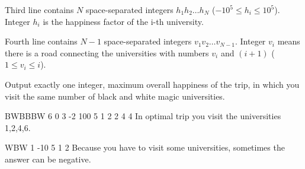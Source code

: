 Third line contains $N$ space-separated integers $h_1 h_2 \ldots h_N$ ($-10^5 \leq h_i \leq 10^5$).
Integer $h_i$ is the happiness factor of the i-th university.

Fourth line contains $N-1$ space-separated integers $v_1 v_2 \ldots v_{N-1}$.
Integer $v_i$ means there is a road connecting the universities with numbers $v_i$ and $(i+1)$ ($1 \leq v_i \leq i$).



Output exactly one integer, maximum overall happiness of the trip, in which
you visit the same number of black and white magic universities.



BWBBBW
6 0 3 -2 100 5
1 2 2 4 4
\sampleCOMMENT
In optimal trip you visit the universities 1,2,4,6.
\sampleEND

\bigskip

WBW
1 -10 5
1 2
\sampleCOMMENT
Because you have to visit some universities, sometimes the
answer can be negative.
\sampleEND

